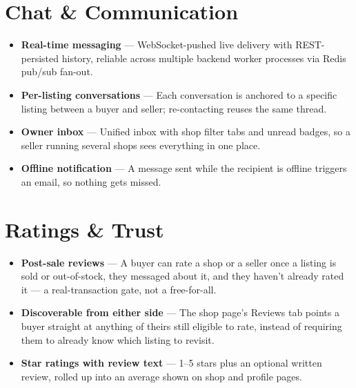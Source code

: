 \documentclass[11pt]{article}
\newcommand{\feature}[2]{%
  \item \textbf{#1} --- #2
}
\begin{document}
\section{Chat \& Communication}
\begin{itemize}
  \feature{Real-time messaging}{WebSocket-pushed live delivery with REST-persisted history, reliable across multiple backend worker processes via Redis pub/sub fan-out.}
  \feature{Per-listing conversations}{Each conversation is anchored to a specific listing between a buyer and seller; re-contacting reuses the same thread.}
  \feature{Owner inbox}{Unified inbox with shop filter tabs and unread badges, so a seller running several shops sees everything in one place.}
  \feature{Offline notification}{A message sent while the recipient is offline triggers an email, so nothing gets missed.}
\end{itemize}

\section{Ratings \& Trust}
\begin{itemize}
  \feature{Post-sale reviews}{A buyer can rate a shop or a seller once a listing is sold or out-of-stock, they messaged about it, and they haven't already rated it --- a real-transaction gate, not a free-for-all.}
  \feature{Discoverable from either side}{The shop page's Reviews tab points a buyer straight at anything of theirs still eligible to rate, instead of requiring them to already know which listing to revisit.}
  \feature{Star ratings with review text}{1--5 stars plus an optional written review, rolled up into an average shown on shop and profile pages.}
\end{itemize}
\end{document}
